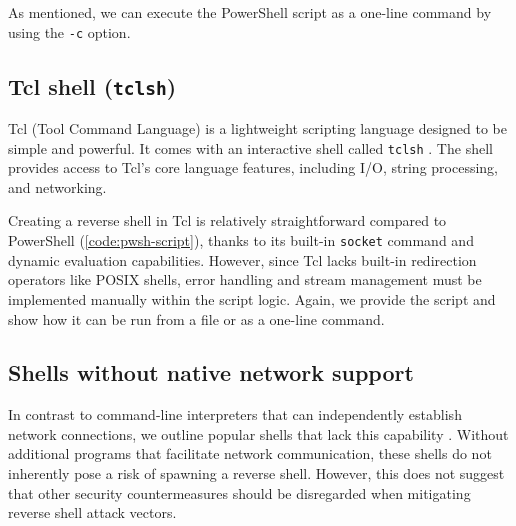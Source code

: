 As mentioned, we can execute the PowerShell script as a one-line command by using the \texttt{-c} option.



\subsection{Tcl shell (\texttt{tclsh})}


Tcl (Tool Command Language) is a lightweight scripting language designed to be simple and powerful. It comes with an interactive shell called \texttt{tclsh} \cite{tclsh-man}. The shell provides access to Tcl's core language features, including I/O, string processing, and networking.

Creating a reverse shell in Tcl is relatively straightforward compared to PowerShell (\cref{code:pwsh-script}), thanks to its built-in \texttt{socket} command and dynamic evaluation capabilities. However, since Tcl lacks built-in redirection operators like POSIX shells, error handling and stream management must be implemented manually within the script logic. Again, we provide the script and show how it can be run from a file or as a one-line command.






\subsection{Shells without native network support}
\label{sec:no-network-shells}

In contrast to command-line interpreters that can independently establish network connections, we outline popular shells that lack this capability \cite{shell-comparison-wiki}. Without additional programs that facilitate network communication, these shells do not inherently pose a risk of spawning a reverse shell. However, this does not suggest that other security countermeasures should be disregarded when mitigating reverse shell attack vectors.

